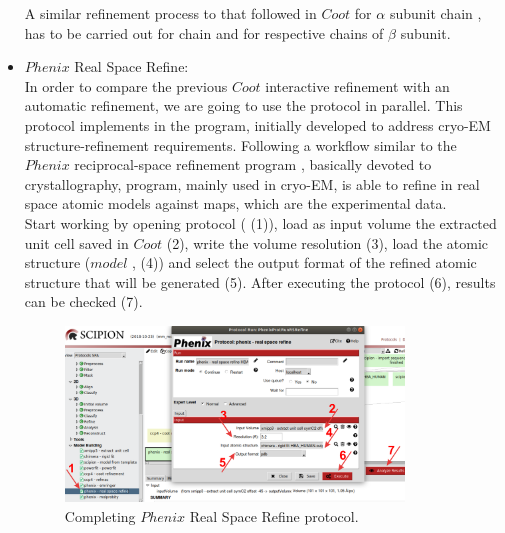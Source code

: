 \begin{itemize}
 A similar refinement process to that followed in $Coot$ for  $\alpha$ subunit chain , has to be carried out for chain  and for respective chains of  $\beta$ subunit.\\
 
 
 \item $Phenix$ Real Space Refine:\\
 
 In order to compare the previous $Coot$ interactive refinement with an automatic refinement, we are going to use the
  protocol in parallel. This protocol implements in \scipion the  program, initially developed to address cryo-EM structure-refinement requirements. Following a workflow similar to the $Phenix$ reciprocal-space refinement program , basically devoted to crystallography,  program, mainly used in cryo-EM, is able to refine in real space atomic models against maps, which are the experimental data.\\
 
 Start working by opening  protocol ( (1)), load as input volume the extracted unit cell saved in $Coot$ (2), write the volume resolution (3), load the atomic structure ($model$ , (4)) and select the output format of the refined atomic structure that will be generated (5). After executing the protocol (6), results can be checked (7). 
 
 \begin{figure}[H]
  \centering 
  \captionsetup{width=.7\linewidth} 
  \includegraphics[width=0.85\textwidth]{Images/Fig29.png}
  \caption{Completing $Phenix$ Real Space Refine protocol.}
  \label{fig:phenix_real_space_refine_protocol}
  \end{figure}
 

\end{itemize}
